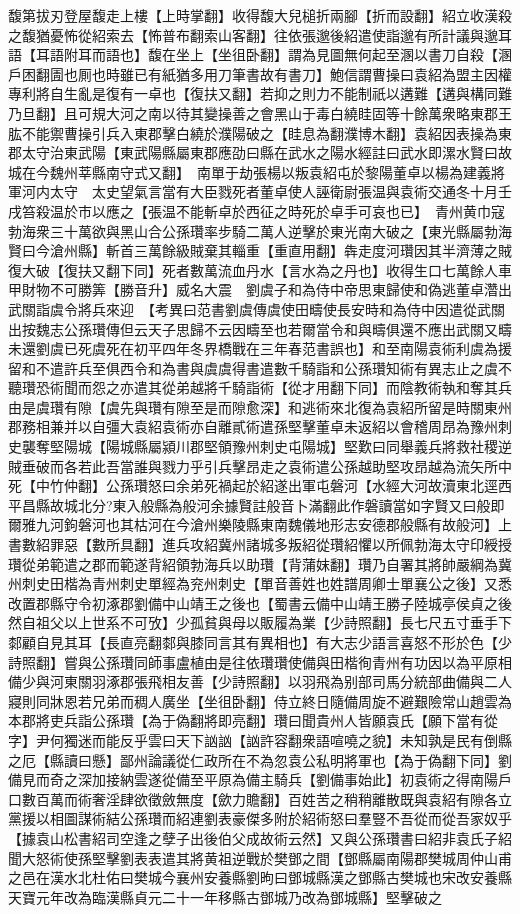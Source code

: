 馥第拔刃登屋馥走上樓【上時掌翻】收得馥大兒槌折兩腳【折而設翻】紹立收漢殺之馥猶憂怖從紹索去【怖普布翻索山客翻】往依張邈後紹遣使詣邈有所計議與邈耳語【耳語附耳而語也】馥在坐上【坐徂卧翻】謂為見圖無何起至溷以書刀自殺【溷戶困翻圊也厠也時雖已有紙猶多用刀筆書故有書刀】鮑信謂曹操曰袁紹為盟主因權專利將自生亂是復有一卓也【復扶又翻】若抑之則力不能制祇以遘難【遘與構同難乃旦翻】且可規大河之南以待其變操善之會黑山于毒白繞眭固等十餘萬衆略東郡王肱不能禦曹操引兵入東郡擊白繞於濮陽破之【眭息為翻濮博木翻】袁紹因表操為東郡太守治東武陽【東武陽縣屬東郡應劭曰縣在武水之陽水經註曰武水即漯水賢曰故城在今魏州莘縣南守式又翻】　南單于劫張楊以叛袁紹屯於黎陽董卓以楊為建義將軍河内太守　太史望氣言當有大臣戮死者董卓使人誣衛尉張温與袁術交通冬十月壬戌笞殺温於市以應之【張温不能斬卓於西征之時死於卓手可哀也已】　青州黄巾寇勃海衆三十萬欲與黑山合公孫瓚率步騎二萬人逆擊於東光南大破之【東光縣屬勃海賢曰今滄州縣】斬首三萬餘級賊棄其輜重【重直用翻】犇走度河瓚因其半濟薄之賊復大破【復扶又翻下同】死者數萬流血丹水【言水為之丹也】收得生口七萬餘人車甲財物不可勝筭【勝音升】威名大震　劉虞子和為侍中帝思東歸使和偽逃董卓濳出武關詣虞令將兵來迎　【考異曰范書劉虞傳虞使田疇使長安時和為侍中因遣從武關出按魏志公孫瓚傳但云天子思歸不云因疇至也若爾當令和與疇俱還不應出武關又疇未還劉虞已死虞死在初平四年冬界橋戰在三年春范書誤也】和至南陽袁術利虞為援留和不遣許兵至俱西令和為書與虞虞得書遣數千騎詣和公孫瓚知術有異志止之虞不聽瓚恐術聞而怨之亦遣其從弟越將千騎詣術【從才用翻下同】而陰教術執和奪其兵由是虞瓚有隙【虞先與瓚有隙至是而隙愈深】和逃術來北復為袁紹所留是時關東州郡務相兼并以自彊大袁紹袁術亦自離貳術遣孫堅擊董卓未返紹以會稽周昂為豫州刺史襲奪堅陽城【陽城縣屬潁川郡堅領豫州刺史屯陽城】堅歎曰同舉義兵將救社稷逆賊垂破而各若此吾當誰與戮力乎引兵擊昂走之袁術遣公孫越助堅攻昂越為流矢所中死【中竹仲翻】公孫瓚怒曰余弟死禍起於紹遂出軍屯磐河【水經大河故瀆東北逕西平昌縣故城北分?東入般縣為般河余據賢註般音卜滿翻此作磐讀當如字賢又曰般即爾雅九河鉤磐河也其枯河在今滄州樂陵縣東南魏儀地形志安德郡般縣有故般河】上書數紹罪惡【數所具翻】進兵攻紹冀州諸城多叛紹從瓚紹懼以所佩勃海太守印綬授瓚從弟範遣之郡而範遂背紹領勃海兵以助瓚【背蒲妺翻】瓚乃自署其將帥嚴綱為冀州刺史田楷為青州刺史單經為兖州刺史【單音善姓也姓譜周卿士單襄公之後】又悉改置郡縣守令初涿郡劉備中山靖王之後也【蜀書云備中山靖王勝子陸城亭侯貞之後然自祖父以上世系不可攷】少孤貧與母以販履為業【少詩照翻】長七尺五寸垂手下䣛顧自見其耳【長直亮翻䣛與膝同言其有異相也】有大志少語言喜怒不形於色【少詩照翻】嘗與公孫瓚同師事盧植由是往依瓚瓚使備與田楷徇青州有功因以為平原相備少與河東關羽涿郡張飛相友善【少詩照翻】以羽飛為别部司馬分統部曲備與二人寢則同牀恩若兄弟而稠人廣坐【坐徂卧翻】侍立終日隨備周旋不避艱險常山趙雲為本郡將吏兵詣公孫瓚【為于偽翻將即亮翻】瓚曰聞貴州人皆願袁氏【願下當有從字】尹何獨迷而能反乎雲曰天下訩訩【訩許容翻衆語喧嘵之貌】未知孰是民有倒縣之厄【縣讀曰懸】鄙州論議從仁政所在不為忽袁公私明將軍也【為于偽翻下同】劉備見而奇之深加接納雲遂從備至平原為備主騎兵【劉備事始此】初袁術之得南陽戶口數百萬而術奢淫肆欲徵斂無度【歛力贍翻】百姓苦之稍稍離散既與袁紹有隙各立黨援以相圖謀術結公孫瓚而紹連劉表豪傑多附於紹術怒曰羣豎不吾從而從吾家奴乎【據袁山松書紹司空逢之孽子出後伯父成故術云然】又與公孫瓚書曰紹非袁氏子紹聞大怒術使孫堅擊劉表表遣其將黄祖逆戰於樊鄧之間【鄧縣屬南陽郡樊城周仲山甫之邑在漢水北杜佑曰樊城今襄州安養縣劉昫曰鄧城縣漢之鄧縣古樊城也宋改安養縣天寶元年改為臨漢縣貞元二十一年移縣古鄧城乃改為鄧城縣】堅擊破之